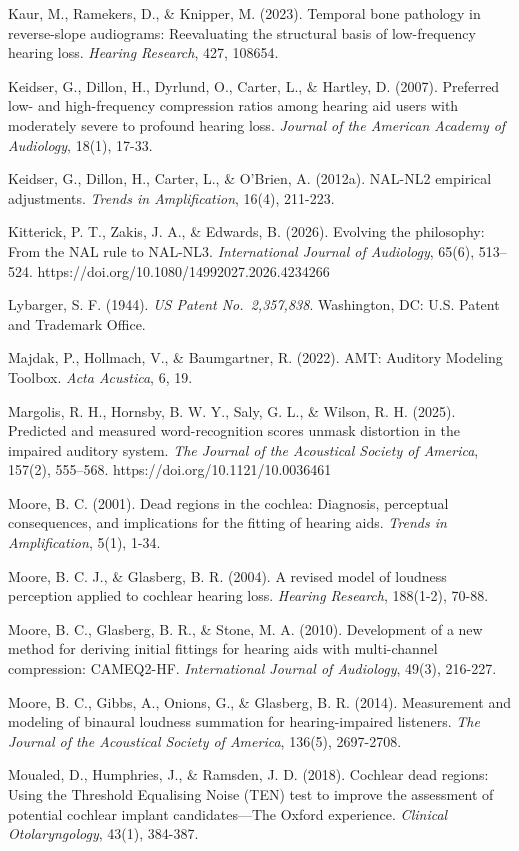 \documentclass[
  12pt,
]{article}
\begin{document}
Kaur, M., Ramekers, D., \& Knipper, M. (2023). Temporal bone pathology
in reverse-slope audiograms: Reevaluating the structural basis of
low-frequency hearing loss. \emph{Hearing Research}, 427, 108654.

Keidser, G., Dillon, H., Dyrlund, O., Carter, L., \& Hartley, D. (2007).
Preferred low- and high-frequency compression ratios among hearing aid
users with moderately severe to profound hearing loss. \emph{Journal of
the American Academy of Audiology}, 18(1), 17-33.

Keidser, G., Dillon, H., Carter, L., \& O'Brien, A. (2012a). NAL-NL2
empirical adjustments. \emph{Trends in Amplification}, 16(4), 211-223.

Kitterick, P. T., Zakis, J. A., \& Edwards, B. (2026). Evolving the
philosophy: From the NAL rule to NAL-NL3. \emph{International Journal of
Audiology}, 65(6), 513--524.
https://doi.org/10.1080/14992027.2026.4234266

Lybarger, S. F. (1944). \emph{US Patent No.~2,357,838}. Washington, DC:
U.S. Patent and Trademark Office.

Majdak, P., Hollmach, V., \& Baumgartner, R. (2022). AMT: Auditory
Modeling Toolbox. \emph{Acta Acustica}, 6, 19.

Margolis, R. H., Hornsby, B. W. Y., Saly, G. L., \& Wilson, R. H.
(2025). Predicted and measured word-recognition scores unmask distortion
in the impaired auditory system. \emph{The Journal of the Acoustical
Society of America}, 157(2), 555--568.
https://doi.org/10.1121/10.0036461

Moore, B. C. (2001). Dead regions in the cochlea: Diagnosis, perceptual
consequences, and implications for the fitting of hearing aids.
\emph{Trends in Amplification}, 5(1), 1-34.

Moore, B. C. J., \& Glasberg, B. R. (2004). A revised model of loudness
perception applied to cochlear hearing loss. \emph{Hearing Research},
188(1-2), 70-88.

Moore, B. C., Glasberg, B. R., \& Stone, M. A. (2010). Development of a
new method for deriving initial fittings for hearing aids with
multi-channel compression: CAMEQ2-HF. \emph{International Journal of
Audiology}, 49(3), 216-227.

Moore, B. C., Gibbs, A., Onions, G., \& Glasberg, B. R. (2014).
Measurement and modeling of binaural loudness summation for
hearing-impaired listeners. \emph{The Journal of the Acoustical Society
of America}, 136(5), 2697-2708.

Moualed, D., Humphries, J., \& Ramsden, J. D. (2018). Cochlear dead
regions: Using the Threshold Equalising Noise (TEN) test to improve the
assessment of potential cochlear implant candidates---The Oxford
experience. \emph{Clinical Otolaryngology}, 43(1), 384-387.
\end{document}
